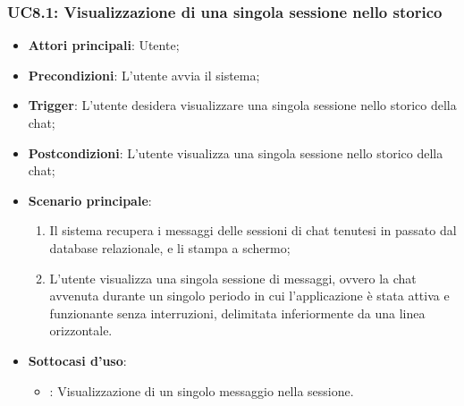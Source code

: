 \subsubsection{UC8.1: Visualizzazione di una singola sessione nello storico}
\begin{itemize}
    \item \textbf{Attori principali}: Utente;
    \item \textbf{Precondizioni}: L'utente avvia il sistema;
    \item \textbf{Trigger}: L'utente desidera visualizzare una singola sessione nello storico della chat;
    \item \textbf{Postcondizioni}: L'utente visualizza una singola sessione nello storico della chat;
    \item \textbf{Scenario principale}:
    \begin{enumerate}
        \item Il sistema recupera i messaggi delle sessioni di chat tenutesi in passato dal database relazionale, e li stampa a schermo;
        \item L'utente visualizza una singola sessione di messaggi, ovvero la chat avvenuta durante un singolo periodo in cui l'applicazione
        è stata attiva e funzionante senza interruzioni, delimitata inferiormente da una linea orizzontale.
    \end{enumerate}
    \item \textbf{Sottocasi d'uso}:
    \begin{itemize}
        \item {}: Visualizzazione di un singolo messaggio nella sessione.
    \end{itemize}
\end{itemize}

\hypertarget{UC8.1.1}{}

